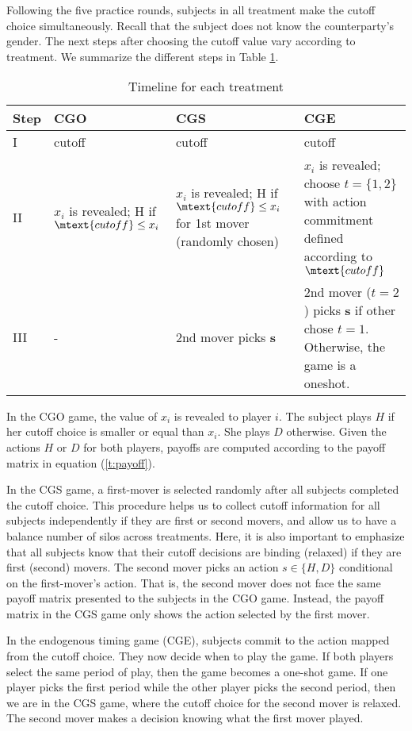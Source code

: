 \documentclass[12pt,english]{article}
\begin{document}
Following the five practice rounds, subjects in all treatment make the cutoff choice simultaneously. Recall that the subject does not know the counterparty's gender. The next steps after choosing the cutoff value vary according to treatment. We summarize the different steps in Table \ref{table:time}. 

\begin{table}[ht]
\begin{center}
\begin{tabular}{l|m{2.4cm}|m{3.5cm}|m{4cm}}
  Step & CGO & CGS & CGE\\
  \hline 
I & cutoff & cutoff & cutoff \\
\hline
II& $x_i$ is revealed; H if $\mtext{cutoff}\leq x_i$ & $x_i$ is revealed; H if $\mtext{cutoff}\leq x_i$ for 1st mover (randomly chosen)
& $x_i$ is revealed; choose $t=\{1,2\}$ with action commitment defined according to $\mtext{cutoff}$\\
\hline
III & - & 2nd mover picks \textbf{s} & 2nd mover ($t=2$) picks \textbf{s} if other chose $t=1$. Otherwise, the game is a oneshot.

\end{tabular}
\end{center}
\caption{Timeline for each treatment}
\label{table:time}
\end{table}

In the CGO game, the value of $x_i$ is revealed to player $i$. The subject plays $H$ if her cutoff choice is smaller or equal than $x_i$. She plays $D$ otherwise. Given the actions $H$ or $D$ for both players, payoffs are computed according to the payoff matrix in equation (\ref{t:payoff}). 

In the CGS game, a first-mover is selected randomly after all subjects completed the cutoff choice. This procedure helps us to collect cutoff information for all subjects independently if they are first or second movers, and allow us to have a balance number of silos across treatments. Here, it is also important to emphasize that all subjects know that their cutoff decisions are binding (relaxed) if they are first (second) movers. The second mover picks an action $s\in\{H,D\}$ conditional on the first-mover's action. That is, the second mover does not face the same payoff matrix presented to the subjects in the CGO game. Instead, the payoff matrix in the CGS game only shows the action selected by the first mover. 

In the endogenous timing game (CGE), subjects commit to the action mapped from the cutoff choice. They now decide when to play the game. If both players select the same period of play, then the game becomes a one-shot game. If one player picks the first period while the other player picks the second period, then we are in the CGS game, where the cutoff choice for the second mover is relaxed. The second mover makes a decision knowing what the first mover played. 
\end{document}
